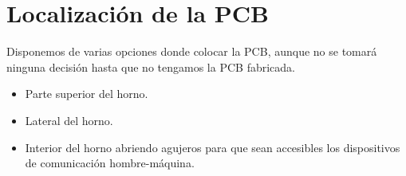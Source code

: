 \section{Localización de la \acrshort{PCB}}
Disponemos de varias opciones donde colocar la \acrshort{PCB}, aunque no se tomará ninguna decisión hasta que no tengamos la \acrshort{PCB} fabricada.

\begin{itemize}
\item Parte superior del horno.
\item Lateral del horno.
\item Interior del horno abriendo agujeros para que sean accesibles los dispositivos de comunicación hombre-máquina.
\end{itemize}


